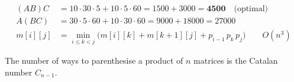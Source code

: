 \begin{formulas}
\begin{align*}
(AB)C &= 10\cdot30\cdot5 + 10\cdot5\cdot60 = 1500 + 3000 = \mathbf{4500} \quad\text{(optimal)}\\
A(BC) &= 30\cdot5\cdot60 + 10\cdot30\cdot60 = 9000 + 18000 = 27000\\
m[i][j] &= \min_{i \le k < j}\bigl(m[i][k] + m[k+1][j] + p_{i-1}\,p_k\,p_j\bigr) \qquad O(n^3)
\end{align*}
\end{formulas}
\noindent The number of ways to parenthesise a product of $n$ matrices is the Catalan number $C_{n-1}$.
